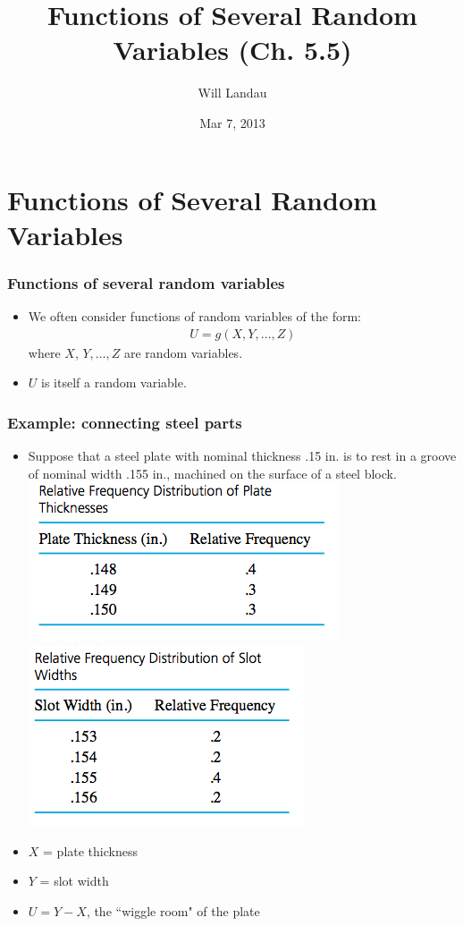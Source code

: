 \documentclass[handout]{beamer}\usepackage{graphicx, color}
\title{Functions of Several Random Variables (Ch. 5.5)}
\author{Will Landau}
\date{Mar 7, 2013}
\institute{Iowa State University}
\providecommand{\q}{$\quad$ \newline}
\numberwithin{equation}{section}
\begin{document}
\begin{frame}
\titlepage
 \end{frame}
 

\section{Functions of Several Random Variables}

\begin{frame}
\frametitle{Functions of several random variables}
\begin{itemize}
\pause \item We often consider functions of random variables of the form:
\pause \begin{align*}
U = g(X, Y, \ldots, Z)
\end{align*}
\pause where $X$, $Y, \ldots, Z$ are random variables.
\pause \item $U$ is itself a random variable.
\end{itemize}
\end{frame}


\begin{frame}
\frametitle{Example: connecting steel parts}
\begin{itemize}
\item Suppose that a steel plate with nominal thickness .15 in. is to rest in a groove of nominal width .155 in., machined on the surface of a steel block. \q \q
{} \includegraphics{../../fig/platet.png}
 \includegraphics{../../fig/slott.png}
\pause \item $X$ = plate thickness
\pause \item $Y$ = slot width
\pause \item $U=Y-X$, the ``wiggle room" of the plate
\end{itemize}
\end{frame}
\end{document}
